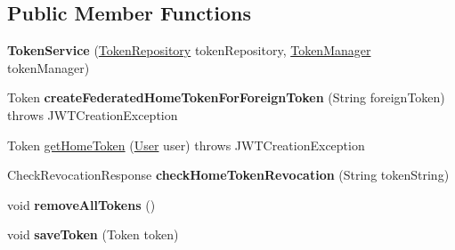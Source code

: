 \subsection*{Public Member Functions}
\begin{DoxyCompactItemize}
\item 
{\bfseries Token\+Service} (\hyperlink{interfaceeu_1_1h2020_1_1symbiote_1_1security_1_1repositories_1_1TokenRepository}{Token\+Repository} token\+Repository, \hyperlink{classeu_1_1h2020_1_1symbiote_1_1security_1_1commons_1_1TokenManager}{Token\+Manager} token\+Manager)\hypertarget{classeu_1_1h2020_1_1symbiote_1_1security_1_1services_1_1TokenService_ac63dd08a68ce3fb1625b534496856949}{}\label{classeu_1_1h2020_1_1symbiote_1_1security_1_1services_1_1TokenService_ac63dd08a68ce3fb1625b534496856949}

\item 
Token {\bfseries create\+Federated\+Home\+Token\+For\+Foreign\+Token} (String foreign\+Token)  throws J\+W\+T\+Creation\+Exception \hypertarget{classeu_1_1h2020_1_1symbiote_1_1security_1_1services_1_1TokenService_af9f0ff25f06558e38d0d6c301f69c7ab}{}\label{classeu_1_1h2020_1_1symbiote_1_1security_1_1services_1_1TokenService_af9f0ff25f06558e38d0d6c301f69c7ab}

\item 
Token \hyperlink{classeu_1_1h2020_1_1symbiote_1_1security_1_1services_1_1TokenService_a2381d5a63769cff11c281c4d180904cd}{get\+Home\+Token} (\hyperlink{classeu_1_1h2020_1_1symbiote_1_1security_1_1commons_1_1User}{User} user)  throws J\+W\+T\+Creation\+Exception 
\item 
Check\+Revocation\+Response {\bfseries check\+Home\+Token\+Revocation} (String token\+String)\hypertarget{classeu_1_1h2020_1_1symbiote_1_1security_1_1services_1_1TokenService_a86627004cbd20b1eebd16657bba52324}{}\label{classeu_1_1h2020_1_1symbiote_1_1security_1_1services_1_1TokenService_a86627004cbd20b1eebd16657bba52324}

\item 
void {\bfseries remove\+All\+Tokens} ()\hypertarget{classeu_1_1h2020_1_1symbiote_1_1security_1_1services_1_1TokenService_a11455b98f0dd409cead6ce2a9121c741}{}\label{classeu_1_1h2020_1_1symbiote_1_1security_1_1services_1_1TokenService_a11455b98f0dd409cead6ce2a9121c741}

\item 
void {\bfseries save\+Token} (Token token)\hypertarget{classeu_1_1h2020_1_1symbiote_1_1security_1_1services_1_1TokenService_ab7fd9f64e419041cc100dc8900c47188}{}\label{classeu_1_1h2020_1_1symbiote_1_1security_1_1services_1_1TokenService_ab7fd9f64e419041cc100dc8900c47188}


\end{DoxyCompactItemize}
